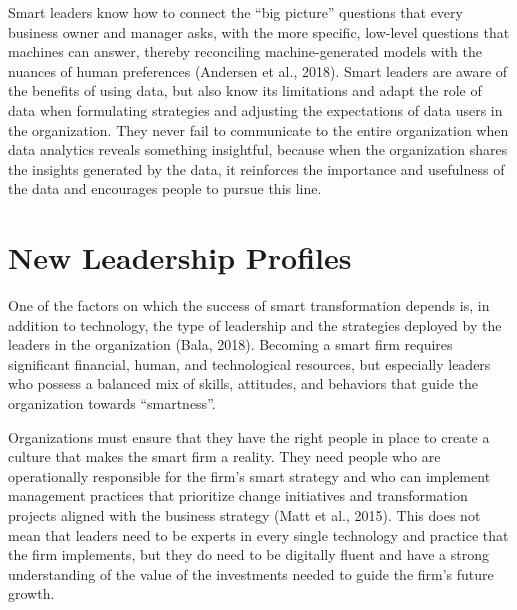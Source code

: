 \documentclass[
  letterpaper,
  DIV=11,
  numbers=noendperiod]{scrreprt}
\begin{document}
Smart leaders know how to connect the ``big picture'' questions that
every business owner and manager asks, with the more specific, low-level
questions that machines can answer, thereby reconciling
machine-generated models with the nuances of human preferences (Andersen
et al., 2018). Smart leaders are aware of the benefits of using data,
but also know its limitations and adapt the role of data when
formulating strategies and adjusting the expectations of data users in
the organization. They never fail to communicate to the entire
organization when data analytics reveals something insightful, because
when the organization shares the insights generated by the data, it
reinforces the importance and usefulness of the data and encourages
people to pursue this line.

\hypertarget{new-leadership-profiles}{%
\section{New Leadership Profiles}\label{new-leadership-profiles}}

One of the factors on which the success of smart transformation depends
is, in addition to technology, the type of leadership and the strategies
deployed by the leaders in the organization (Bala, 2018). Becoming a
smart firm requires significant financial, human, and technological
resources, but especially leaders who possess a balanced mix of skills,
attitudes, and behaviors that guide the organization towards
``smartness''.

Organizations must ensure that they have the right people in place to
create a culture that makes the smart firm a reality. They need people
who are operationally responsible for the firm's smart strategy and who
can implement management practices that prioritize change initiatives
and transformation projects aligned with the business strategy (Matt et
al., 2015). This does not mean that leaders need to be experts in every
single technology and practice that the firm implements, but they do
need to be digitally fluent and have a strong understanding of the value
of the investments needed to guide the firm's future growth.
\end{document}
